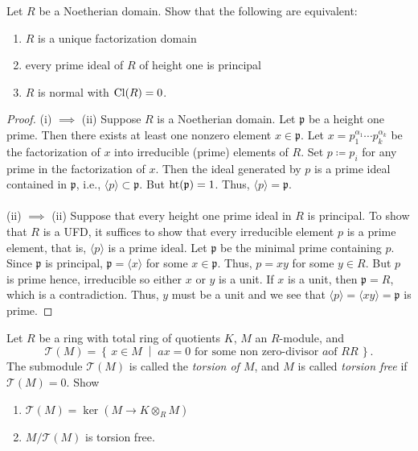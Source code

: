 \begin{problem}
Let $R$ be a Noetherian domain. Show that the following are equivalent:
\begin{enumerate}[label=(\roman*)]
\item $R$ is a unique factorization domain
\item every prime ideal of $R$ of height one is principal
\item $R$ is normal with $\operatorname{Cl}(R)=0$.
\end{enumerate}
\end{problem}
\begin{proof}
(i) $\implies$ (ii) Suppose $R$ is a Noetherian domain. Let $\mathfrak{p}$
be a height one prime. Then there exists at least one nonzero element
$x\in\mathfrak{p}$. Let $x=p_1^{\alpha_1}\cdots p_k^{\alpha_k}$ be the
factorization of $x$ into irreducible (prime) elements of $R$. Set
$p\coloneqq p_i$ for any prime in the factorization of $x$. Then the ideal
generated by $p$ is a prime ideal contained in $\mathfrak{p}$, i.e.,
$\langle p \rangle\subset\mathfrak{p}$. But $\operatorname{ht}(\mathfrak{p})=1$. Thus,
$\langle p \rangle=\mathfrak{p}$.
\\\\
(ii) $\implies$ (ii) Suppose that every height one prime ideal in $R$ is
principal. To show that $R$ is a UFD, it suffices to show that every
irreducible element $p$ is a prime element, that is, $\langle p\rangle$ is
a prime ideal. Let $\mathfrak{p}$ be the minimal prime containing
$p$. Since $\mathfrak{p}$ is principal, $\mathfrak{p}=\langle x\rangle$ for
some $x\in\mathfrak{p}$. Thus, $p=xy$ for some $y\in R$. But $p$ is prime
hence, irreducible so either $x$ or $y$ is a unit. If $x$ is a unit, then
$\mathfrak{p}=R$, which is a contradiction. Thus, $y$ must be a unit and we
see that $\langle p\rangle=\langle xy\rangle=\mathfrak{p}$ is
prime.
\end{proof}
\newpage
\begin{problem}
Let $R$ be a ring with total ring of quotients $K$, $M$ an $R$-module, and
\[
\mathcal{T}(M)=\left\{\,x\in M\;\middle|\;\text{$ax=0$ for some non zero-divisor $a$
    of $RR$}\,\right\}.
\]
The submodule $\mathcal{T}(M)$ is called the \emph{torsion of $M$}, and $M$ is called
\emph{torsion free} if $\mathcal{T}(M)=0$. Show
\begin{enumerate}[label=(\alph*)]
\item $\mathcal{T}(M)=\ker(M\to K\otimes_R M)$
\item $M/\mathcal{T}(M)$ is torsion free.
\end{enumerate}
\end{problem}
